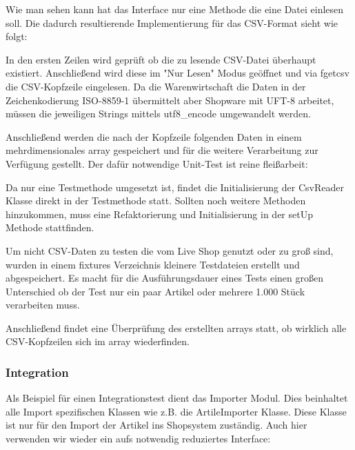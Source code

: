 

Wie man sehen kann hat das Interface nur eine Methode die eine Datei einlesen soll. Die dadurch resultierende Implementierung für das CSV-Format sieht wie folgt:



In den ersten Zeilen wird geprüft ob die zu lesende CSV-Datei überhaupt existiert. Anschließend wird diese im "Nur Lesen" Modus geöffnet und via fgetcsv die CSV-Kopfzeile eingelesen. Da die Warenwirtschaft die Daten in der Zeichenkodierung ISO-8859-1 übermittelt aber Shopware mit UFT-8 arbeitet, müssen die jeweiligen Strings mittels utf8\_encode umgewandelt werden.

Anschließend werden die nach der Kopfzeile folgenden Daten in einem mehrdimensionales array gespeichert und für die weitere Verarbeitung zur Verfügung gestellt. Der dafür notwendige Unit-Test ist reine fleißarbeit: 



Da nur eine Testmethode umgesetzt ist, findet die Initialisierung der CsvReader Klasse direkt in der Testmethode statt. Sollten noch weitere Methoden hinzukommen, muss eine Refaktorierung und Initialisierung in der setUp Methode stattfinden.

Um nicht CSV-Daten zu testen die vom Live Shop genutzt oder zu groß sind, wurden in einem fixtures Verzeichnis kleinere Testdateien erstellt und abgespeichert. Es macht für die Ausführungsdauer eines Tests einen großen Unterschied ob der Test nur ein paar Artikel oder mehrere 1.000 Stück verarbeiten muss. 

Anschließend findet eine Überprüfung des erstellten arrays statt, ob wirklich alle CSV-Kopfzeilen sich im array wiederfinden.

\subsubsection{Integration}

Als Beispiel für einen Integrationstest dient das Importer Modul. Dies beinhaltet alle Import spezifischen Klassen wie z.B. die ArtileImporter Klasse. Diese Klasse ist nur für den Import der Artikel ins Shopsystem zuständig. Auch hier verwenden wir wieder ein aufs notwendig reduziertes Interface:




